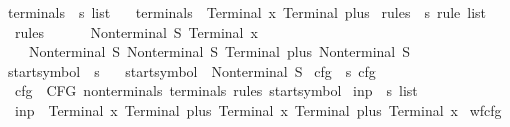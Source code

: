 \begin{isabellebody}
\isanewline
{}\isamarkupfalse%
\ terminals\ {\isacharcolon}{\kern0pt}{\isacharcolon}{\kern0pt}\ {\isachardoublequoteopen}s\ list{\isachardoublequoteclose}\ \isanewline
\ \ {\isachardoublequoteopen}terminals\ {\isacharequal}{\kern0pt}\ {\isacharbrackleft}{\kern0pt}Terminal\ x{\isacharcomma}{\kern0pt}\ Terminal\ plus{\isacharbrackright}{\kern0pt}{\isachardoublequoteclose}\isanewline
\isanewline
{}\isamarkupfalse%
\ rules\ {\isacharcolon}{\kern0pt}{\isacharcolon}{\kern0pt}\ {\isachardoublequoteopen}s\ rule\ list{\isachardoublequoteclose}\ \isanewline
\ \ {\isachardoublequoteopen}rules\ {\isacharequal}{\kern0pt}\ {\isacharbrackleft}{\kern0pt}\isanewline
\ \ \ \ {\isacharparenleft}{\kern0pt}Nonterminal\ S{\isacharcomma}{\kern0pt}\ {\isacharbrackleft}{\kern0pt}Terminal\ x{\isacharbrackright}{\kern0pt}{\isacharparenright}{\kern0pt}{\isacharcomma}{\kern0pt}\isanewline
\ \ \ \ {\isacharparenleft}{\kern0pt}Nonterminal\ S{\isacharcomma}{\kern0pt}\ {\isacharbrackleft}{\kern0pt}Nonterminal\ S{\isacharcomma}{\kern0pt}\ Terminal\ plus{\isacharcomma}{\kern0pt}\ Nonterminal\ S{\isacharbrackright}{\kern0pt}{\isacharparenright}{\kern0pt}\isanewline
\ \ {\isacharbrackright}{\kern0pt}{\isachardoublequoteclose}\isanewline
\isanewline
{}\isamarkupfalse%
\ start{\isacharunderscore}{\kern0pt}symbol\ {\isacharcolon}{\kern0pt}{\isacharcolon}{\kern0pt}\ s\ \isanewline
\ \ {\isachardoublequoteopen}start{\isacharunderscore}{\kern0pt}symbol\ {\isacharequal}{\kern0pt}\ Nonterminal\ S{\isachardoublequoteclose}\isanewline
\isanewline
{}\isamarkupfalse%
\ cfg\ {\isacharcolon}{\kern0pt}{\isacharcolon}{\kern0pt}\ {\isachardoublequoteopen}s\ cfg{\isachardoublequoteclose}\ \isanewline
\ \ {\isachardoublequoteopen}cfg\ {\isacharequal}{\kern0pt}\ CFG\ nonterminals\ terminals\ rules\ start{\isacharunderscore}{\kern0pt}symbol{\isachardoublequoteclose}\isanewline
\isanewline
{}\isamarkupfalse%
\ inp\ {\isacharcolon}{\kern0pt}{\isacharcolon}{\kern0pt}\ {\isachardoublequoteopen}s\ list{\isachardoublequoteclose}\ \isanewline
\ \ {\isachardoublequoteopen}inp\ {\isacharequal}{\kern0pt}\ {\isacharbrackleft}{\kern0pt}Terminal\ x{\isacharcomma}{\kern0pt}\ Terminal\ plus{\isacharcomma}{\kern0pt}\ Terminal\ x{\isacharcomma}{\kern0pt}\ Terminal\ plus{\isacharcomma}{\kern0pt}\ Terminal\ x{\isacharbrackright}{\kern0pt}{\isachardoublequoteclose}\isanewline
\isanewline
{}\isamarkupfalse%
\ wf{\isacharunderscore}{\kern0pt}cfg{\isacharcolon}{\kern0pt}\isanewline

\end{isabellebody}

